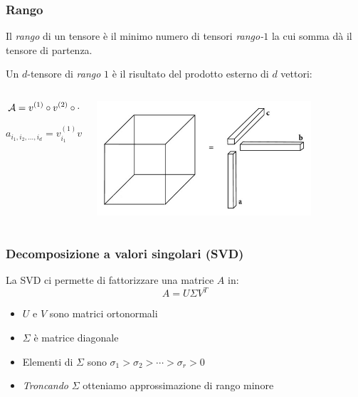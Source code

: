 \documentclass[compress]{beamer}
\theoremstyle{definition}
\theoremstyle{plain}
\begin{document}
\begin{frame}
\frametitle{Rango}
Il \emph{rango} di un tensore è il minimo numero di tensori \emph{rango-$1$} la cui somma dà il tensore di partenza.

\pause
\vspace{5mm}
Un $d$-tensore di \emph{rango} $1$ è il risultato del prodotto esterno di $d$ vettori:

\begin{columns}
\begin{column}{0.5\textwidth}
\begin{equation*}
  \mathcal{A} = v^{(1)} \circ v^{(2)} \circ \cdots \circ v^{(d)}
\end{equation*}

\begin{equation*}
  a_{i_1,i_2,\ldots,i_d} = v_{i_1}^{(1)} v_{i_2}^{(2)} \cdots v_{i_d}^{(d)}
\end{equation*}
\end{column}

\begin{column}{0.5\textwidth}
\begin{center}
	\includegraphics[width=0.8\textwidth]{Img/rank_one_tensor.jpg}
\end{center}
\end{column}
\end{columns}
\end{frame}

\begin{frame}
\frametitle{Decomposizione a valori singolari (SVD)}
La SVD ci permette di fattorizzare una matrice $A$ in:
\begin{equation*}
	A = U \Sigma V^T
\end{equation*}
\begin{itemize}
	\item $U$ e $V$ sono matrici ortonormali
	\item $\Sigma$ è matrice diagonale	
	\item Elementi di $\Sigma$ sono $\sigma_1 > \sigma_2 > \cdots > \sigma_r > 0$
	\item \emph{Troncando} $\Sigma$ otteniamo approssimazione di rango minore
\end{itemize}
\end{frame}
\end{document}
